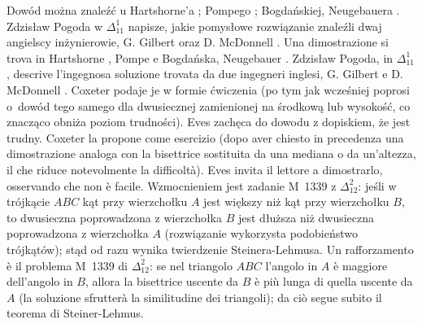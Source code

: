 Dowód można znaleźć u Hartshorne'a \cite[s. 11]{hartshorne_2000}; Pompego \cite[s. 32, 33]{pompe_2022}; Bogdańskiej, Neugebauera \cite[s. 74]{neugebauer_2018}. %
Zdzisław Pogoda w $\Delta_{11}^1$ napisze, jakie pomysłowe rozwiązanie znaleźli dwaj angielscy inżynierowie, G. Gilbert oraz D. McDonnell \cite{gilbert_mcdonnell_1963}. %
Una dimostrazione si trova in Hartshorne \cite[p. 11]{hartshorne_2000}, Pompe \cite[pp. 32, 33]{pompe_2022} e Bogdańska, Neugebauer \cite[p. 74]{neugebauer_2018}. %
Zdzisław Pogoda, in $\Delta_{11}^1$, descrive l'ingegnosa soluzione trovata da due ingegneri inglesi, G. Gilbert e D. McDonnell \cite{gilbert_mcdonnell_1963}. %
%
%
Coxeter \cite[s. 32]{coxeter_1967} podaje je w formie ćwiczenia (po tym jak wcześniej \cite[s. 26, 33]{coxeter_1967} poprosi o~dowód tego samego dla dwusiecznej zamienionej na środkową lub wysokość, co znacząco obniża poziom trudności). %
Eves \cite[s. 19, 58]{eves1_1972} zachęca do dowodu z dopiskiem, że jest trudny. %
Coxeter \cite[p. 32]{coxeter_1967} la propone come esercizio (dopo aver chiesto in precedenza \cite[pp. 26, 33]{coxeter_1967} una dimostrazione analoga con la bisettrice sostituita da una mediana o da un'altezza, il che riduce notevolmente la difficoltà). %
Eves \cite[pp. 19, 58]{eves1_1972} invita il lettore a dimostrarlo, osservando che non è facile. %
Wzmocnieniem jest zadanie M~1339 z $\Delta_{12}^{2}$: jeśli w trójkącie $ABC$ kąt przy wierzchołku $A$ jest większy niż kąt przy wierzchołku $B$, to dwusieczna poprowadzona z wierzchołka $B$ jest dłuższa niż dwusieczna poprowadzona z wierzchołka $A$ (rozwiązanie wykorzysta podobieństwo trójkątów); stąd od razu wynika twierdzenie Steinera-Lehmusa. %
Un rafforzamento è il problema M~1339 di $\Delta_{12}^{2}$: se nel triangolo $ABC$ l'angolo in $A$ è maggiore dell'angolo in $B$, allora la bisettrice uscente da $B$ è più lunga di quella uscente da $A$ (la soluzione sfrutterà la similitudine dei triangoli); da ciò segue subito il teorema di Steiner-Lehmus. %


%